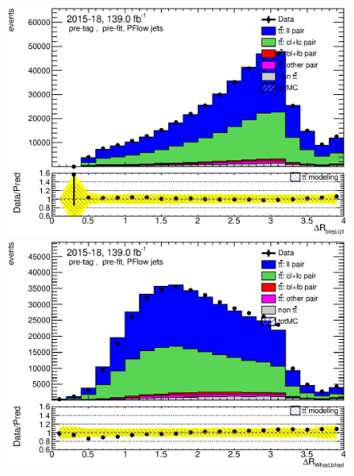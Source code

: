 \documentclass[letterpaper,12pt]{article}
\begin{document}
\begin{figure}[H]
\begin{minipage}[b]{.45\textwidth}
	\end{minipage}\hfill
	\begin{minipage}[b]{.45\textwidth}
	\centering
	\includegraphics[width=1\textwidth]{Oct_distributions/pretagNoRwDL1rwithhighpTPFlow_scaledall/DataMC_dRblepq1.eps} 
	\end{minipage}\hfill
	\begin{minipage}[b]{.45\textwidth}
	\centering
	\includegraphics[width=1\textwidth]{Oct_distributions/pretagNoRwDL1rwithhighpTPFlow_scaledall/DataMC_dRWhadbhad.eps} 
	\end{minipage}\hfill
	\begin{minipage}[b]{.45\textwidth}
	\centering

\end{minipage}
\end{figure}
\end{document}
